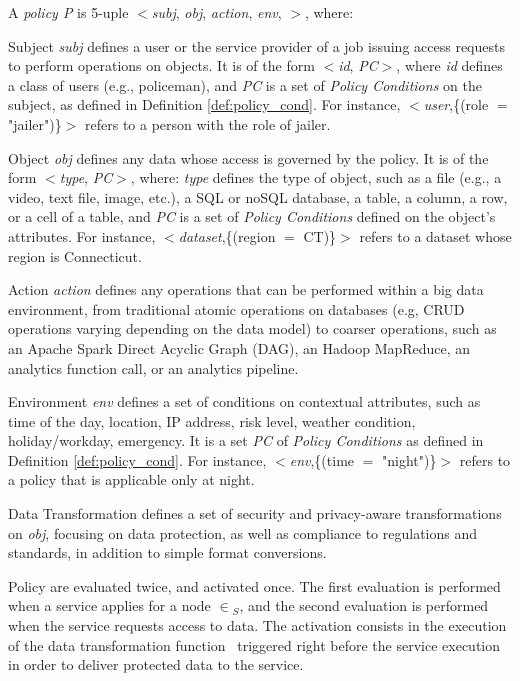 \begin{definition}[Policy]\label{def:policy_rule}
  A {\it policy P} is 5-uple $<$\textit{subj}, \textit{obj}, \textit{action}, \textit{env}, \textit{\TP}$>$, where:
  \begin{description}
    \item Subject \textit{subj} defines a user or the service provider of a job issuing access requests to perform operations on objects. It is of the form $<$\emph{id}, \emph{PC}$>$, where \emph{id} defines a class of users (e.g., policeman), and \emph{PC} is a set of \emph{Policy Conditions} on the subject, as defined in Definition \ref{def:policy_cond}. For instance, $<$\emph{user},\{(role $=$ "jailer")\}$>$ refers to a person with the role of jailer.

    \item Object \textit{obj} defines any data whose access is governed by the policy. It is of the form $<$\emph{type}, \emph{PC}$>$, where: \emph{type} defines the type of object, such as a file (e.g., a video, text file, image, etc.), a SQL or noSQL database, a table, a column, a row, or a cell of a table, and \emph{PC} is a set of \emph{Policy Conditions} defined on the object's attributes. For instance, $<$\emph{dataset},\{(region $=$ CT)\}$>$ refers to a dataset whose region is Connecticut.

    \item Action \textit{action} defines any operations that can be performed within a big data environment, from traditional atomic operations on databases (e.g, CRUD operations varying depending on the data model) to coarser operations, such as an Apache Spark Direct Acyclic Graph (DAG), an Hadoop MapReduce, an analytics function call, or an analytics pipeline.

    \item Environment \textit{env} defines a set of conditions on contextual attributes, such as time of the day, location, IP address, risk level, weather condition, holiday/workday, emergency. It is a set \emph{PC} of \emph{Policy Conditions} as defined in Definition \ref{def:policy_cond}. For instance, $<$\emph{env},\{(time $=$ "night")\}$>$ refers to a policy that is applicable only at night.

    \item Data Transformation \textit{\TP} defines a set of security and privacy-aware transformations on \textit{obj}, focusing on data protection, as well as compliance to regulations and standards, in addition to simple format conversions.
  \end{description}
\end{definition}
Policy are evaluated twice, and activated once. The first evaluation is performed when a service applies for a node $\in$\V$_S$, and the second evaluation is performed when the service requests access to data.
The activation consists in the execution of the data transformation function \TP\ triggered right before the service execution in order to deliver protected data to the service.

